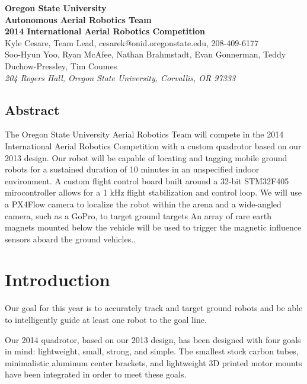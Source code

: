 \documentclass[12pt,letterpaper]{article} \usepackage[margin=1in]{geometry}
\begin{document}
\begin{center}
	{\bf\Large Oregon State University \\
		Autonomous Aerial Robotics Team \\
		2014 International Aerial Robotics Competition \\ [1em]
	}
	{\footnotesize Kyle Cesare, Team Lead, cesarek@onid.oregonstate.edu, 208-409-6177 \\
		Soo-Hyun Yoo, Ryan McAfee, Nathan Brahmstadt, Evan Gonnerman, Teddy Duchow-Pressley, Tim Coumes  \\ [0.5em]
		\emph{204 Rogers Hall, Oregon State University, Corvallis, OR 97333}
	}
\end{center}


\begin{center} \begin{minipage}{5.5in}

\section*{Abstract}

The Oregon State University Aerial Robotics Team will compete in the 2014
International Aerial Robotics Competition with a custom quadrotor based on our
2013 design. Our robot will be capable of locating and tagging mobile ground
robots for a sustained duration of 10 minutes in an unspecified indoor
environment. A custom flight control board built around a 32-bit STM32F405
mirocontroller allows for a 1 kHz flight stabilization and control loop. We will
use a PX4Flow camera to localize the robot within the arena and a wide-angled
camera, such as a GoPro, to target ground targets An array of rare earth magnets
mounted below the vehicle will be used to trigger the magnetic influence sensors
aboard the ground vehicles..

\end{minipage} \end{center}



\section*{Introduction}

Our goal for this year is to accurately track and target ground robots and be
able to intelligently guide at least one robot to the goal line.

Our 2014 quadrotor, based on our 2013 design, has been designed with four goals
in mind: lightweight, small, strong, and simple. The smallest stock carbon
tubes, minimalistic aluminum center brackets, and lightweight 3D printed motor
mounts have been integrated in order to meet these goals.
\end{document}
